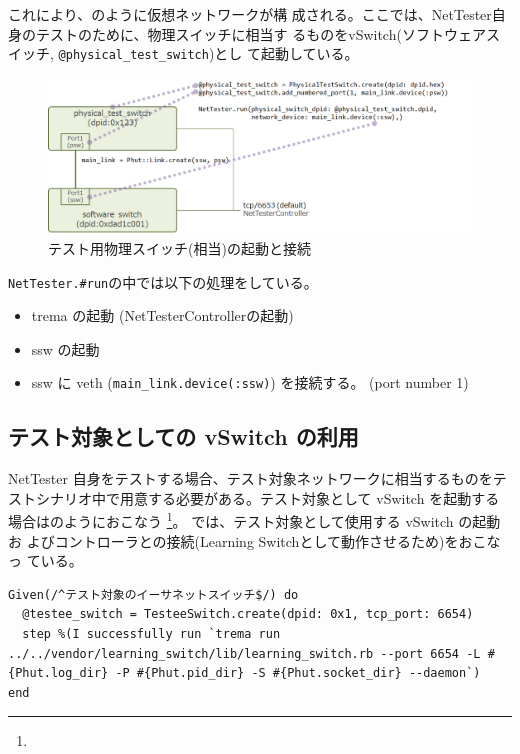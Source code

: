 これにより、のように仮想ネットワークが構
成される。ここでは、NetTester自身のテストのために、物理スイッチに相当す
るものをvSwitch(ソフトウェアスイッチ, \verb|@physical_test_switch|)とし
て起動している。

\begin{figure}[h]
 \centering
 \includegraphics[scale=0.6]{img/phut-psw-ssw-model.png}
 \caption{テスト用物理スイッチ(相当)の起動と接続}
 \label{fig:phut-psw-ssw-model}
\end{figure}

\verb|NetTester.#run|の中では以下の処理をしている。

\begin{itemize}
 \item trema の起動 (NetTesterControllerの起動)
 \item ssw の起動
 \item ssw に veth (\verb|main_link.device(:ssw)|) を接続する。
       (port number 1)
\end{itemize}

\subsection{テスト対象としての vSwitch の利用}

NetTester 自身をテストする場合、テスト対象ネットワークに相当するものをテ
ストシナリオ中で用意する必要がある。テスト対象として vSwitch を起動する
場合はのようにおこなう
\footnote{}。
では、テスト対象として使用する vSwitch の起動お
よびコントローラとの接続(Learning Switchとして動作させるため)をおこなっ
ている。

\begin{lstlisting}[caption=vSwitchの起動,label=lst:run-vswitch]
Given(/^テスト対象のイーサネットスイッチ$/) do
  @testee_switch = TesteeSwitch.create(dpid: 0x1, tcp_port: 6654)
  step %(I successfully run `trema run ../../vendor/learning_switch/lib/learning_switch.rb --port 6654 -L #{Phut.log_dir} -P #{Phut.pid_dir} -S #{Phut.socket_dir} --daemon`)
end
\end{lstlisting}

